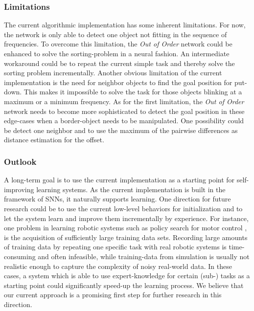 \subsubsection{Limitations}%
\label{ssubsec:limitations}

The current algorithmic implementation has some inherent limitations. 
For now, the network is only able to detect one object not fitting in the sequence of frequencies. 
To overcome this limitation, the \emph{Out of Order} network could be enhanced to solve the sorting-problem in a neural fashion. 
An intermediate workaround could be to repeat the current simple task and thereby solve the sorting problem incrementally. 
Another obvious limitation of the current implementation is the need for neighbor objects to find the goal position for put-down. 
This makes it impossible to solve the task for those objects blinking at a maximum or a minimum frequency. 
As for the first limitation, the \emph{Out of Order} network needs to become more sophisticated to detect the goal position in these edge-cases when a border-object needs to be manipulated. 
One possibility could be detect one neighbor and to use the maximum of the pairwise differences as distance estimation for the offset. 

\subsubsection{Outlook}%
\label{ssubsec:outlook}

A long-term goal is to use the current implementation as a starting point for self-improving learning systems. 
As the current implementation is built in the framework of \acfp{SNN}, it naturally supports learning. 
One direction for future research could be to use the current low-level behaviors for initialization and to let the system learn and improve them incrementally by experience. 
For instance, one problem in learning robotic systems such as policy search for motor control \parencite{Levine2015}, is the acquisition of sufficiently large training data sets. 
Recording large amounts of training data by repeating one specific task with real robotic systems is time-consuming and often infeasible, while training-data from simulation is usually not realistic enough to capture the complexity of noisy real-world data. 
In these cases, a system which is able to use expert-knowledge for certain (sub-) tasks as a starting point could significantly speed-up the learning process. 
We believe that our current approach is a promising first step for further research in this direction.


